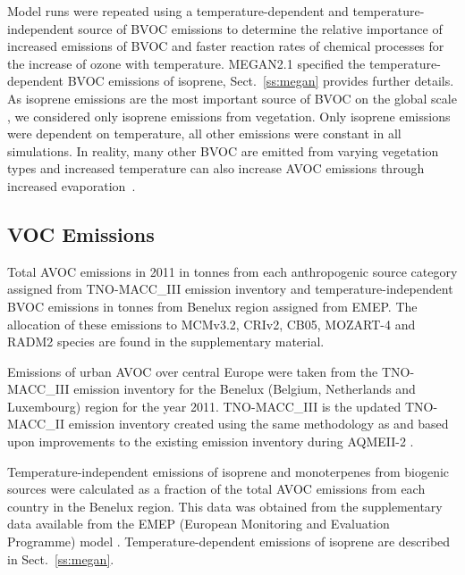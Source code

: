 Model runs were repeated using a temperature-dependent and temperature-independent source of BVOC emissions to determine the relative importance of increased emissions of BVOC and faster reaction rates of chemical processes for the increase of ozone with temperature. 
MEGAN2.1 \citep{Guenther:2012} specified the temperature-dependent BVOC emissions of isoprene, Sect.~\ref{ss:megan} provides further details. 
As isoprene emissions are the most important source of BVOC on the global scale \citep{Guenther:2006}, we considered only isoprene emissions from vegetation. 
Only isoprene emissions were dependent on temperature, all other emissions were constant in all simulations.
In reality, many other BVOC are emitted from varying vegetation types \citep{Guenther:2006} and increased temperature can also increase AVOC emissions through increased \mbox{evaporation \citep{Rubin:2006}}.

\subsection{VOC Emissions} \label{ss:VOC_emissions}
{%
    \renewcommand{\arraystretch}{1.1}%
    \begin{table}[t]%
        \centering%
        \caption{Total AVOC emissions in 2011 in tonnes from each anthropogenic source category assigned from TNO-MACC\_III emission inventory and temperature-independent BVOC emissions in tonnes from Benelux region assigned from EMEP. The allocation of these emissions to MCMv3.2, CRIv2, CB05, MOZART-4 and RADM2 species are found in the supplementary material.}%
        \label{t:emissions}%
    \end{table}%
}
Emissions of urban AVOC over central Europe were taken from the TNO-MACC\_III emission inventory for the Benelux (Belgium, Netherlands and Luxembourg) region for the year 2011.
TNO-MACC\_III is the updated TNO-MACC\_II emission inventory created using the same methodology as \citet{Kuenen:2014} and based upon improvements to the existing emission inventory during AQMEII-2 \citep{Pouliot:2015}. 

Temperature-independent emissions of isoprene and monoterpenes from biogenic sources were calculated as a fraction of the total AVOC emissions from each country in the Benelux region.
This data was obtained from the supplementary data available from the EMEP (European Monitoring and Evaluation Programme) model \citep{Simpson:2012}.
Temperature-dependent emissions of isoprene are described in Sect.~\ref{ss:megan}.

